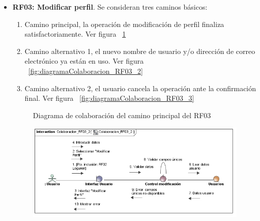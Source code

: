\begin{itemize}
	\FloatBarrier
	\item \textbf{RF03: Modificar perfil}. Se consideran tres caminos básicos: 
	\begin{enumerate}
		\item Camino principal, la operación de modificación de perfil finaliza satisfactoriamente. Ver figura ~\ref{fig:diagramaColaboracion_RF03_1}
		\item Camino alternativo 1, el nuevo nombre de usuario y/o dirección de correo electrónico ya están en uso. Ver figura ~\ref{fig:diagramaColaboracion_RF03_2}
		\item Camino alternativo 2, el usuario cancela la operación ante la confirmación final. Ver figura ~\ref{fig:diagramaColaboracion_RF03_3}
	\end{enumerate}
	\begin{figure} [!htb]
		\centering
		\caption{Diagrama de colaboración del camino principal del RF03}
		\label{fig:diagramaColaboracion_RF03_1}
	\end{figure}
	\begin{figure} [!htb]
		\centering
		\includegraphics[width=\linewidth,height=\textheight,keepaspectratio]{Images/Diagramas/04_Colaboracion_RF03_2}

\end{figure}
\end{itemize}
